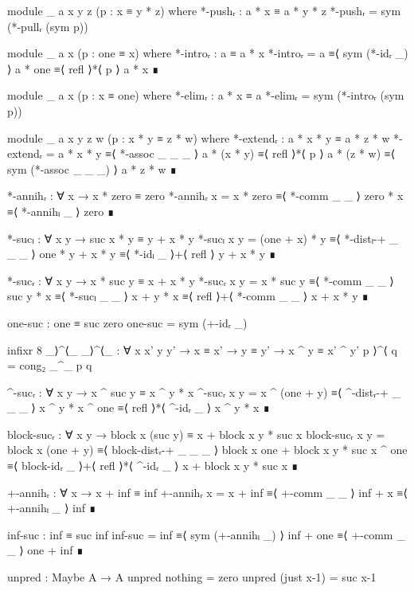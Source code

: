 \begin{code}[hide]
    module _ {a x y z} (p : x ≡ y * z) where
      *-pushᵣ : a * x ≡ a * y * z
      *-pushᵣ = sym (*-pullᵣ (sym p))

    module _ {a x} (p : one ≡ x) where
      *-introᵣ : a ≡ a * x
      *-introᵣ =
        a       ≡⟨ sym (*-idᵣ _) ⟩
        a * one ≡⟨ refl ⟩*⟨ p ⟩
        a * x   ∎

    module _ {a x} (p : x ≡ one) where
      *-elimᵣ : a * x ≡ a
      *-elimᵣ = sym (*-introᵣ (sym p))

    module _ {a x y z w} (p : x * y ≡ z * w) where
      *-extendᵣ : a * x * y ≡ a * z * w
      *-extendᵣ =
        a * x * y   ≡⟨ *-assoc _ _ _ ⟩
        a * (x * y) ≡⟨ refl ⟩*⟨ p ⟩
        a * (z * w) ≡⟨ sym (*-assoc _ _ _) ⟩
        a * z * w   ∎

    *-annihᵣ : ∀ x → x * zero ≡ zero
    *-annihᵣ x =
      x * zero ≡⟨ *-comm _ _ ⟩
      zero * x ≡⟨ *-annihₗ _ ⟩
      zero     ∎

    *-sucₗ : ∀ x y → suc x * y ≡ y + x * y
    *-sucₗ x y =
      (one + x) * y   ≡⟨ *-distₗ-+ _ _ _ ⟩
      one * y + x * y ≡⟨ *-idₗ _ ⟩+⟨ refl ⟩
      y + x * y       ∎

    *-sucᵣ : ∀ x y → x * suc y ≡ x + x * y
    *-sucᵣ x y =
      x * suc y ≡⟨ *-comm _ _ ⟩
      suc y * x ≡⟨ *-sucₗ _ _ ⟩
      x + y * x ≡⟨ refl ⟩+⟨ *-comm _ _ ⟩
      x + x * y ∎

    one-suc : one ≡ suc zero
    one-suc = sym (+-idᵣ _)

    infixr 8 _⟩^⟨_
    _⟩^⟨_ : ∀ {x x' y y'} → x ≡ x' → y ≡ y' → x ^ y ≡ x' ^ y'
    p ⟩^⟨ q = cong₂ _^_ p q

    ^-sucᵣ : ∀ x y → x ^ suc y ≡ x ^ y * x
    ^-sucᵣ x y =
      x ^ (one + y)   ≡⟨ ^-distᵣ-+ _ _ _ ⟩
      x ^ y * x ^ one ≡⟨ refl ⟩*⟨ ^-idᵣ _ ⟩
      x ^ y * x       ∎

    block-sucᵣ : ∀ x y → block x (suc y) ≡ x + block x y * suc x
    block-sucᵣ x y =
      block x (one + y)                     ≡⟨ block-distᵣ-+ _ _ _ ⟩
      block x one + block x y * suc x ^ one ≡⟨ block-idᵣ _ ⟩+⟨ refl ⟩*⟨ ^-idᵣ _ ⟩
      x + block x y * suc x                 ∎

    +-annihᵣ : ∀ x → x + inf ≡ inf
    +-annihᵣ x =
      x + inf ≡⟨ +-comm _ _ ⟩
      inf + x ≡⟨ +-annihₗ _ ⟩
      inf     ∎

    inf-suc : inf ≡ suc inf
    inf-suc =
      inf       ≡⟨ sym (+-annihₗ _) ⟩
      inf + one ≡⟨ +-comm _ _ ⟩
      one + inf ∎

    unpred : Maybe A → A
    unpred nothing = zero
    unpred (just x-1) = suc x-1


\end{code}
